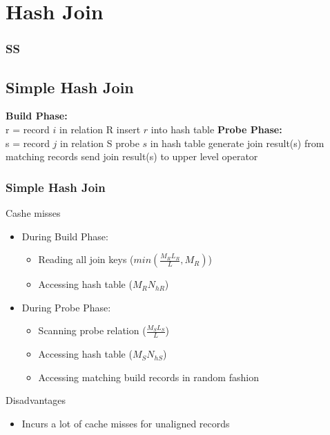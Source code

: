 \section{Hash Join}

\begin{frame}
\frametitle{SS}



\end{frame}

\subsection{Simple Hash Join}
\begin{frame}

\begin{algorithm}[H]
\dontprintsemicolon
\SetVline


\textbf{Build Phase:} \\
{
	r = record $i$ in relation R \;
	insert $r$ into hash table \;
}
\textbf{Probe Phase:} \\
{
	s = record $j$ in relation S \;
	probe $s$ in hash table \;
	{
		generate join result(s) from matching records \;
		send join result(s) to upper level operator \;
	}
}
\end{algorithm}
\end{frame}

\begin{frame}[red] %
\frametitle{Simple Hash Join}

Cashe misses
\begin{itemize}
\item During Build Phase:
	\begin{itemize}
	\item Reading all join keys ($min(\frac{M_RL_R}{L},M_R)$)
	\item Accessing hash table ($M_RN_{hR}$)
	\end{itemize}
\item During Probe Phase:
	\begin{itemize}
	\item Scanning probe relation ($\frac{M_SL_S}{L}$)
	\item Accessing hash table ($M_SN_{hS}$)
	\item Accessing matching build records in random fashion
	\end{itemize}
\end{itemize}

Disadvantages
\begin{itemize}
\item Incurs a lot of cache misses for unaligned records
\end{itemize}
\end{frame}


